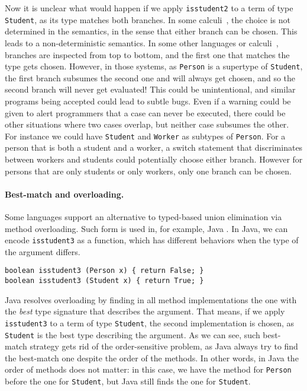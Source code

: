 \noindent Now it is unclear what would happen if we apply \lstinline{isstudent2}
to a term of type \lstinline{Student}, as its type matches both branches. In
some calculi~\citep{dunfield2014elaborating}, the choice is not determined in
the semantics, in the sense that either branch can be chosen. This leads to a
non-deterministic semantics. In some other languages or
calculi~\citep{castagna:settheoretic}, branches are inspected from top to
bottom, and the first one that matches the type gets chosen. However, in those
systems, as \lstinline{Person} is a supertype of \lstinline{Student}, the first
branch subsumes the second one and will always get chosen, and so the second
branch will never get evaluated! This could be unintentional, and similar
programs being accepted could lead to subtle bugs. Even if a warning could be
given to alert programmers that a case can never be executed, there could be
other situations where two cases overlap, but neither case subsumes the other.
For instance we could have \lstinline{Student} and \lstinline{Worker} as
subtypes of \lstinline{Person}. For a person that is both a student and a
worker, a switch statement that discriminates between workers and students could
potentially choose either branch. However for persons that are only students or
only workers, only one branch can be chosen.

\paragraph{Best-match and overloading.}
Some languages support an alternative to typed-based union elimination via method
overloading. Such form is used in, for example, Java \cite{javadoc}. In Java, we
can encode \lstinline{isstudent3} as a function, which has different
behaviors when the type of the argument differs.

\begin{lstlisting}
boolean isstudent3 (Person x) { return False; }
boolean isstudent3 (Student x) { return True; }
\end{lstlisting}

\noindent Java resolves overloading by finding in all method implementations the one with
the \textit{best} type signature that describes the argument. That means, if we
apply \lstinline{isstudent3} to a term of type \lstinline{Student}, the second
implementation is chosen, as \lstinline{Student} is the best type describing the
argument. As we can see, such best-match strategy gets rid of the
order-sensitive problem, as Java always try to find the best-match one despite
the order of the methods. In other words, in Java the order of methods does not matter:
in this case,
we have the method for \lstinline{Person} before the one for \lstinline{Student}, but Java still finds
the one for \lstinline{Student}.

